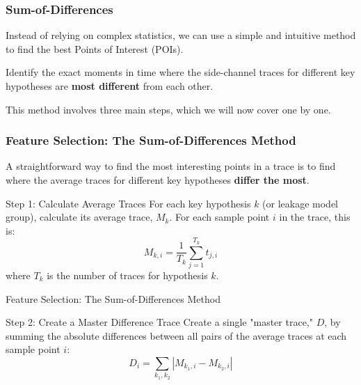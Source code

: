 \begin{frame}
    \frametitle{Sum-of-Differences}

    Instead of relying on complex statistics, we can use a simple and intuitive method to find the best Points of Interest (POIs).

    \begin{block}{}
        Identify the exact moments in time where the side-channel traces for different key hypotheses are \textbf{most different} from each other.
    \end{block}

    This method involves three main steps, which we will now cover one by one.

\end{frame}

\begin{frame}
    \frametitle{Feature Selection: The Sum-of-Differences Method}
    
    A straightforward way to find the most interesting points in a trace is to find where the average traces for different key hypotheses \textbf{differ the most}.
    
    \begin{block}{Step 1: Calculate Average Traces}
        For each key hypothesis $k$ (or leakage model group), calculate its average trace, $M_k$. For each sample point $i$ in the trace, this is:
        \[ M_{k,i} = \frac{1}{T_k} \sum_{j=1}^{T_k} t_{j,i} \]
        where $T_k$ is the number of traces for hypothesis $k$.
    \end{block}
\end{frame}
    

\begin{frame}{Feature Selection: The Sum-of-Differences Method}
    \begin{block}{Step 2: Create a Master Difference Trace}
        Create a single "master trace," $D$, by summing the absolute differences between all pairs of the average traces at each sample point $i$:
        \[ D_i = \sum_{k_1, k_2} |M_{k_1, i} - M_{k_2, i}| \]
    \end{block}
    
\end{frame}


